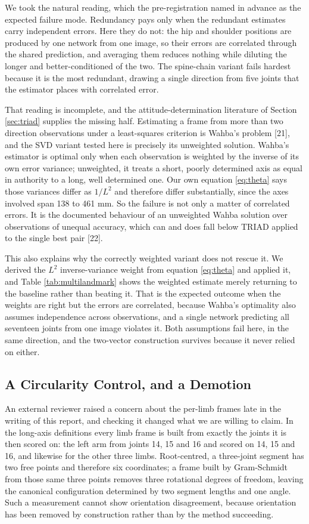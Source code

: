 \documentclass[12pt,a4paper]{report}
\begin{document}
We took the natural reading, which the pre-registration named in advance as the expected failure mode. Redundancy pays only when the redundant estimates carry independent errors. Here they do not: the hip and shoulder positions are produced by one network from one image, so their errors are correlated through the shared prediction, and averaging them reduces nothing while diluting the longer and better-conditioned of the two. The spine-chain variant fails hardest because it is the most redundant, drawing a single direction from five joints that the estimator places with correlated error.

That reading is incomplete, and the attitude-determination literature of Section \ref{sec:triad} supplies the missing half. Estimating a frame from more than two direction observations under a least-squares criterion is Wahba's problem [21], and the SVD variant tested here is precisely its unweighted solution. Wahba's estimator is optimal only when each observation is weighted by the inverse of its own error variance; unweighted, it treats a short, poorly determined axis as equal in authority to a long, well determined one. Our own equation \eqref{eq:theta} says those variances differ as $1/L^2$ and therefore differ substantially, since the axes involved span 138 to 461 mm. So the failure is not only a matter of correlated errors. It is the documented behaviour of an unweighted Wahba solution over observations of unequal accuracy, which can and does fall below TRIAD applied to the single best pair [22].

This also explains why the correctly weighted variant does not rescue it. We derived the $L^2$ inverse-variance weight from equation \eqref{eq:theta} and applied it, and Table \ref{tab:multilandmark} shows the weighted estimate merely returning to the baseline rather than beating it. That is the expected outcome when the weights are right but the errors are correlated, because Wahba's optimality also assumes independence across observations, and a single network predicting all seventeen joints from one image violates it. Both assumptions fail here, in the same direction, and the two-vector construction survives because it never relied on either.

\subsection{A Circularity Control, and a Demotion}
\label{sec:circularity}

An external reviewer raised a concern about the per-limb frames late in the writing of this report, and checking it changed what we are willing to claim. In the long-axis definitions every limb frame is built from exactly the joints it is then scored on: the left arm from joints 14, 15 and 16 and scored on 14, 15 and 16, and likewise for the other three limbs. Root-centred, a three-joint segment has two free points and therefore six coordinates; a frame built by Gram-Schmidt from those same three points removes three rotational degrees of freedom, leaving the canonical configuration determined by two segment lengths and one angle. Such a measurement cannot show orientation disagreement, because orientation has been removed by construction rather than by the method succeeding.
\end{document}
